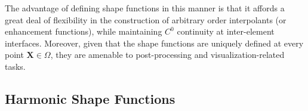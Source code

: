 	
	The advantage of defining shape functions in this manner is that it affords a great deal of flexibility in the construction of arbitrary order interpolants (or enhancement functions), while maintaining $C^0$ continuity at inter-element interfaces. Moreover, given that the shape functions are uniquely defined at every point $\mathbf{X} \in \Omega$, they are amenable to post-processing and visualization-related tasks.
	

\subsection*{Harmonic Shape Functions}



